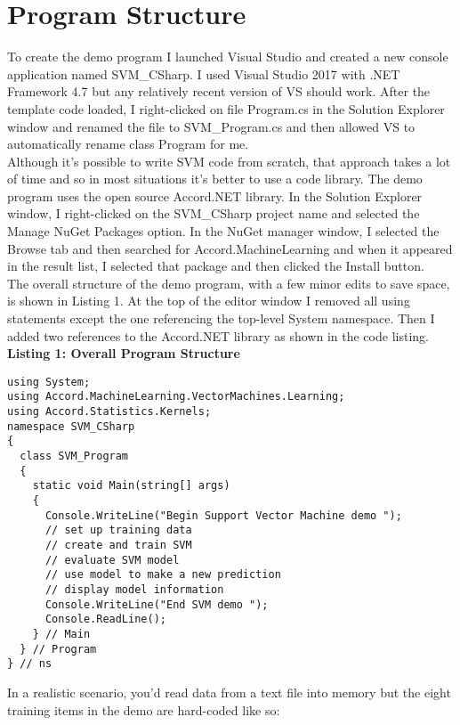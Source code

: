 \documentclass[13pt]{article}
\begin{document}
\section{Program Structure}
To create the demo program I launched Visual Studio and created a new console application named SVM\_CSharp. I used Visual Studio 2017 with .NET Framework 4.7 but any relatively recent version of VS should work. After the template code loaded, I right-clicked on file Program.cs in the Solution Explorer window and renamed the file to SVM\_Program.cs and then allowed VS to automatically rename class Program for me.\\

\noindent
Although it's possible to write SVM code from scratch, that approach takes a lot of time and so in most situations it's better to use a code library. The demo program uses the open source Accord.NET library. In the Solution Explorer window, I right-clicked on the SVM\_CSharp project name and selected the Manage NuGet Packages option. In the NuGet manager window, I selected the Browse tab and then searched for Accord.MachineLearning and when it appeared in the result list, I selected that package and then clicked the Install button.\\

\noindent
The overall structure of the demo program, with a few minor edits to save space, is shown in Listing 1. At the top of the editor window I removed all using statements except the one referencing the top-level System namespace. Then I added two references to the Accord.NET library as shown in the code listing.\\

\noindent
\textbf{Listing 1: Overall Program Structure}

\begin{verbatim}
using System;
using Accord.MachineLearning.VectorMachines.Learning;
using Accord.Statistics.Kernels;
namespace SVM_CSharp
{
  class SVM_Program
  {
    static void Main(string[] args)
    {
      Console.WriteLine("Begin Support Vector Machine demo ");
      // set up training data
      // create and train SVM 
      // evaluate SVM model
      // use model to make a new prediction
      // display model information
      Console.WriteLine("End SVM demo ");
      Console.ReadLine();
    } // Main
  } // Program
} // ns
\end{verbatim}

\noindent
In a realistic scenario, you'd read data from a text file into memory but the eight training items in the demo are hard-coded like so:
\end{document}
